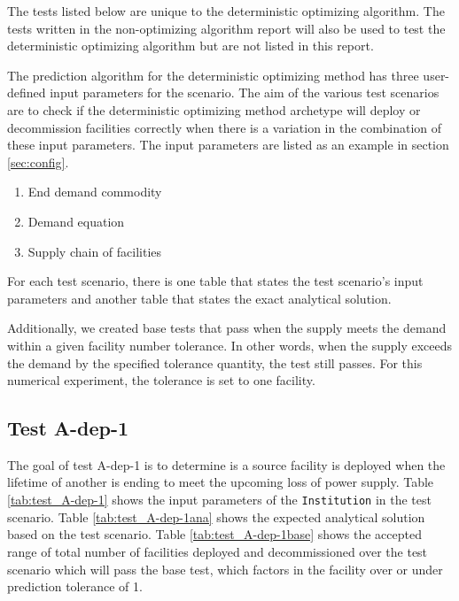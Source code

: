 \documentclass[11pt,letterpaper]{article}
\begin{document}
The tests listed below are unique to the deterministic optimizing algorithm. The tests written in the non-optimizing algorithm report will also be used to test the deterministic optimizing algorithm but are not listed in this report.

The prediction algorithm for the deterministic optimizing method has three user-defined input parameters for the scenario.
The aim of the various test scenarios are to check if the
deterministic optimizing method archetype will deploy or decommission facilities correctly when there is a variation
in the combination of these input parameters. The input parameters are listed as an example in section \ref{sec:config}.

\begin{enumerate}
	\item End demand commodity
	\item Demand equation 
	\item Supply chain of facilities
\end{enumerate}

For each test scenario, there is one table that states the test scenario's input parameters and another table that states the exact analytical solution. 

Additionally, we created base tests that pass when the supply meets the demand within a given facility number tolerance.
In other words, when the supply exceeds the demand by the specified tolerance quantity, the test still passes. For this numerical experiment, the tolerance is set to one facility. 

\subsection{Test A-dep-1}
The goal of test A-dep-1 is to determine is a source facility is deployed when the lifetime of another is ending to meet the upcoming loss of power supply. 
Table \ref{tab:test_A-dep-1} shows the input parameters of the \texttt{Institution} in the test scenario. Table \ref{tab:test_A-dep-1ana} shows the expected analytical solution based on the test scenario. Table \ref{tab:test_A-dep-1base} shows the accepted range of total number of facilities deployed and decommissioned over the test scenario which will pass the base test, which factors in the facility over or under prediction tolerance of 1.
\end{document}

